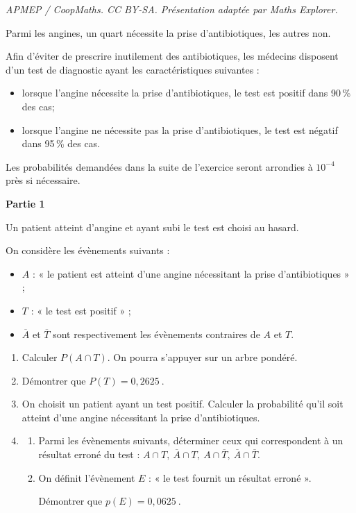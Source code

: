 \documentclass[10pt]{article}
\providecommand{\np}[2][]{{#2~#1}}
\begin{document}
\noindent\textit{APMEP / CoopMaths. CC BY-SA. Présentation adaptée par Maths Explorer.}\par\medskip
\medskip

Parmi les angines, un quart nécessite la prise d'antibiotiques, les autres non.

Afin d'éviter de prescrire inutilement des antibiotiques, les médecins disposent d'un test de diagnostic ayant les caractéristiques suivantes :

\begin{itemize}
\item[$\bullet~~$]lorsque l'angine nécessite la prise d'antibiotiques, le test est positif dans 90\,\% des cas;
\item[$\bullet~~$]lorsque l'angine ne nécessite pas la prise d'antibiotiques, le test est négatif dans 95\,\% des cas.
\end{itemize}

\medskip

Les probabilités demandées dans la suite de l'exercice seront arrondies à $10^{-4}$ près si nécessaire.

\bigskip

\textbf{Partie 1}

\medskip

Un patient atteint d'angine et ayant subi le test est choisi au hasard. 

On considère les évènements suivants :

\begin{itemize}
\item[$\bullet~~$]$A$ : « le patient est atteint d'une angine nécessitant la prise d'antibiotiques »{} ; 
\item[$\bullet~~$]$T$ : « le test est positif »{} ;
\item[$\bullet~~$]$\overline{A}$ et $\overline{T}$ sont respectivement les évènements contraires de $A$ et $T$.
\end{itemize}

\medskip

\begin{enumerate}
\item Calculer $P(A \cap T)$. On pourra s'appuyer sur un arbre pondéré.
\item Démontrer que $P(T) = \np{0,2625}$.
\item On choisit un patient ayant un test positif. Calculer la probabilité qu'il soit atteint d'une angine nécessitant la prise d'antibiotiques.
\item
	\begin{enumerate}
		\item Parmi les évènements suivants, déterminer ceux qui correspondent à un résultat erroné du test :  $A \cap T,\: \overline{A} \cap T,\:A \cap \overline{T},\: \overline{A} \cap \overline{T}$.
		\item On définit l'évènement $E$ : « le test fournit un résultat erroné ». 
		
Démontrer que $p(E) = \np{0,0625}$.
	\end{enumerate}
\end{enumerate}
\end{document}
